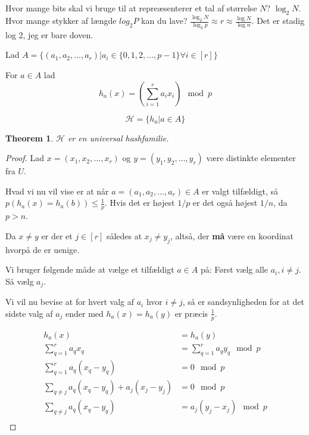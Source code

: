 \documentclass[11pt]{article}
\newtheorem{theorem}{Theorem}
\theoremstyle{definition}
\theoremstyle{remark}
\begin{document}
 Hvor mange bits skal vi bruge til  at repreæsenterer et tal af størrelse $N$? $\log_{2}N$. Hvor mange stykker af længde $log_{2}P$ kan du lave? $\frac{\log_{2}N}{\log_{2}p} \approx r \approx \frac{\log N}{\log n}$. Det er stadig log 2, jeg er bare doven.

Lad $A = \{(a_{1}, a_{2}, \ldots, a_{r}) | a_{i} \in \{0, 1, 2, \ldots, p-1\} \forall i \in [r]\}$

For $a \in A$ lad
\[ h_{a}(x) = \left( \sum_{i=1}^{r} a_{i}x_{i} \right) \mod p \]

\[ \mathcal{H} = \{h_{a} | a \in A\} \]

\begin{theorem}
  $\mathcal{H}$ er en universal hashfamilie.
\end{theorem}

\begin{proof}
  Lad $x = (x_{1}, x_{2}, \ldots, x_{r})$ og $y = (y_{1}, y_{2}, \ldots, y_{r})$ være distinkte elementer fra $U$.

  Hvad vi nu vil vise er at når $a = (a_{1}, a_{2}, \ldots, a_{r}) \in A$ er valgt tilfældigt, så $p(h_{a}(x) = h_{a}(b)) \leq \frac{1}{p}$. Hvis det er højest $1/p$ er det også højest $1/n$, da $p > n$.

  Da $x \neq y$ er der et $j \in [r]$ således at $x_{j} \neq y_{j}$, altså, der \textbf{må} være en koordinat hvorpå de er uenige.

  Vi bruger følgende måde at vælge et tilfældigt $a \in A$ på:
  Først vælg alle $a_{i}, i \neq j$. Så vælg $a_{j}$. 


  Vi vil nu bevise at for hvert valg af $a_{i}$ hvor $i \neq j$, så er sandsynligheden for at det sidste valg af $a_{j}$ ender med $h_{a}(x) = h_{a}(y)$ er præcis $\frac{1}{p}$.

  \begin{equation}
\begin{split}
             h_{a}(x) &= h_{a}(y) \\
  \sum_{q=1}^{r}a_{q}x_{q} &= \sum_{q=1}^{r} a_{q}y_{q} \mod p \\
  \sum_{q = 1}^{r} a_{q}(x_{q}-y_{q}) &= 0 \mod p\\
  \sum_{q \neq j} a_{q} (x_{q} - y_{q}) + a_{j} (x_{j} - y_{j}) &= 0 \mod p \\
  \sum_{q \neq j} a_{q} (x_{q}-y_{q}) &= a_{j}(y_{j}-x_{j}) \mod p\\
  \end{split}
    \end{equation}


\end{proof}
\end{document}
